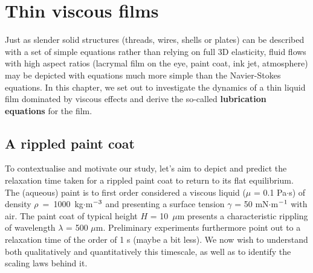\chapter{Thin viscous films}
\label{chap:thin_viscous_films}

Just as slender solid structures (threads, wires, shells or plates) can be described with a set of simple equations rather than relying on full 3D elasticity, fluid flows with high aspect ratios (lacrymal film on the eye, paint coat, ink jet, atmosphere) may be depicted with equations much more simple than the Navier-Stokes equations. In this chapter, we set out to investigate the dynamics of a thin liquid film dominated by viscous effects and derive the so-called \textbf{lubrication equations} for the film.
\section{A rippled paint coat}
To contextualise and motivate our study, let's aim to depict and predict the relaxation time taken for a rippled paint coat to return to its flat equilibrium. The (aqueous) paint is to first order considered a viscous liquid ($\mu$ = 0.1 Pa$\cdot$s) of density $\rho$~=~1000~kg$\cdot$m$^{-\text 3}$ and presenting a surface tension $\gamma$ = 50 mN$\cdot$m$^{-\text 1}$ with air.
The paint coat of typical height $H$ = 10~$\mu$m presents a characteristic rippling of wavelength $\lambda$ = 500 $\mu$m.
Preliminary experiments furthermore point out to a relaxation time of the order of 1 s (maybe a bit less). We now wish to understand both qualitatively and quantitatively this timescale, as well as to identify the scaling laws behind it.
